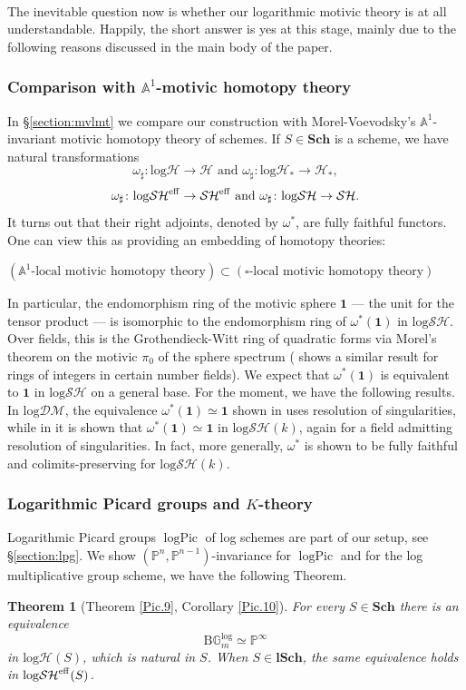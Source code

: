 \documentclass[11pt, a4paper]{amsart}
\newtheorem{thm}{Theorem}[subsection]
\theoremstyle{definition}
\numberwithin{equation}{subsection}
\renewcommand{\P}{\mathbb{P}}
\newcommand{\A}{\mathbb{A}}
\newcommand{\Sch}{\mathbf{Sch}}
\newcommand{\lSch}{\mathbf{lSch}}
\newcommand{\clspace}{\mathrm{B}}
\newcommand{\sharpp}{\sharp}
\newcommand{\logPic}{\operatorname{logPic}}
\newcommand{\boxx}{\square}
\newcommand{\Gmm}{\mathbb{G}_m^{\mathrm{log}}}
\newcommand{\eff}{{\rm eff}}
\newcommand{\unit}{\mathbf{1}}
\newcommand{\infSH}{\mathcal{SH}}
\newcommand{\infSHS}{\mathcal{SH}^{\eff}}
\newcommand{\infH}{\mathcal{H}}
\newcommand{\infHpt}{\mathcal{H}_{\ast}}
\newcommand{\inflogH}{\mathrm{log}\mathcal{H}}
\newcommand{\inflogHpt}{\mathrm{log}\mathcal{H}_\ast}
\newcommand{\inflogSH}{\mathrm{log}\mathcal{SH}}
\newcommand{\inflogSHS}{\mathrm{log}\mathcal{SH}^{\mathrm{eff}}}
\newcommand{\inflogDM}{\mathrm{log}\mathcal{DM}}
\begin{document}
\

The inevitable question now is whether our logarithmic motivic theory is at all understandable. 
Happily, the short answer is yes at this stage, mainly due to the following reasons discussed in
the main body of the paper. 


\subsubsection{Comparison with $\mathbb{A}^1$-motivic homotopy theory} In \S\ref{section:mvlmt} we compare our construction with 
Morel-Voevodsky's $\mathbb{A}^{1}$-invariant motivic homotopy theory of schemes.
If $S\in \Sch$ is a scheme, 
we have natural transformations
\[
\omega_\sharpp \colon \inflogH \to \infH
\text{ and }
\omega_\sharpp\colon \inflogHpt\to \infHpt,
\]
\[
\omega_\sharpp \colon \inflogSHS \to \infSHS
\text{ and }
\omega_\sharpp
\colon
\inflogSH
\to
\infSH.
\]
It turns out that their right adjoints, denoted by $\omega^*$,
are fully faithful functors.
One can view this as providing an embedding of homotopy theories:
\begin{center}
$(\A^1\text{-local motivic homotopy theory})
\subset
(\boxx\text{-local motivic homotopy theory})$
\end{center}
In particular, 
the endomorphism ring of the motivic sphere $\mathbf{1}$ 
--- the unit for the tensor product ---
is isomorphic to the endomorphism ring of $\omega^*(\mathbf{1})$ in $\inflogSH$.
Over fields,
this is the Grothendieck-Witt ring of quadratic forms via Morel's theorem 
on the motivic $\pi_0$ of the sphere spectrum \cite{zbMATH05057435} 
(\cite{zbMATH07472296} shows a similar result for rings of integers in certain number fields).
We expect that $\omega^*(\unit)$ is equivalent to $\unit$ in $\inflogSH$ on a general base.
For the moment, we have the following results. In $\inflogDM$, 
the equivalence $\omega^*(\unit)\simeq \unit$ shown in 
\cite[Theorem 8.2.11]{logDM} uses resolution of singularities, while in \cite[Theorem 1.1]{Doosgroups} it is shown that $\omega^*(\unit) \simeq \unit$ in $\inflogSH(k)$, again for a field admitting resolution of singularities. In fact, more generally, $\omega^*$ is shown to be fully faithful and colimits-preserving for $\inflogSH(k)$.

\subsubsection{Logarithmic Picard groups and $K$-theory}Logarithmic Picard groups $\logPic$ of log schemes are part of our setup, 
see \S\ref{section:lpg}.
We show $(\P^n,\P^{n-1})$-invariance for $\logPic$ and for the log multiplicative group scheme, we have the following Theorem. 
\begin{thm}[{Theorem} \ref{Pic.9}, Corollary \ref{Pic.10}]
For every $S\in \Sch$ there is an equivalence
\[
\clspace \Gmm \simeq \P^\infty
\]
in $\inflogH(S)$,
which is natural in $S$. When $S\in \lSch$, the same equivalence holds in $\inflogSH^\eff(S)$.
\end{thm}
\end{document}

